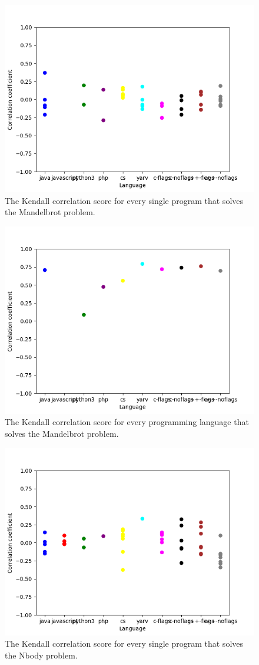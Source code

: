 \begin{appendices}
\begin{figure}[h]
    \centering
    \includegraphics[width=.6\textwidth]{graphs/kendall_Mandelbrot.png}
    \caption{The Kendall correlation score for every single program that solves the Mandelbrot problem.}
    \label{fig:corr-mandelbrot}
\end{figure}

\begin{figure}[h]
    \centering
    \includegraphics[width=.6\textwidth]{graphs/kendall-lang_Mandelbrot.png}
    \caption{The Kendall correlation score for every programming language that solves the Mandelbrot problem.}
    \label{fig:corr-lang-mandelbrot}
\end{figure}

\begin{figure}[h]
    \centering
    \includegraphics[width=.6\textwidth]{graphs/kendall_Nbody.png}
    \caption{The Kendall correlation score for every single program that solves the Nbody problem.}
    \label{fig:corr-nbody}
\end{figure}


\end{appendices}
